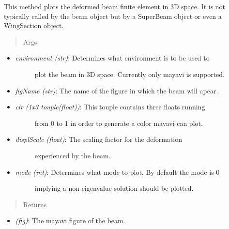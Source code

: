 \documentclass[letterpaper,10pt,english]{sphinxmanual}
\begin{document}
\begin{fulllineitems}
\begin{fulllineitems}
This method plots the deformed beam finite element in 3D space. It is
not typically called by the beam object but by a SuperBeam object
or even a WingSection object.
\begin{quote}\begin{description}
\item[{Args}] \leavevmode
\end{description}\end{quote}
\begin{itemize}
\item {} \begin{description}
\item[{\emph{environment (str)}: Determines what environment is to be used to}] \leavevmode
plot the beam in 3D space. Currently only mayavi is supported.

\end{description}

\item {} 
\emph{figName (str)}: The name of the figure in which the beam will apear.

\item {} \begin{description}
\item[{\emph{clr (1x3 touple(float))}: This touple contains three floats running}] \leavevmode
from 0 to 1 in order to generate a color mayavi can plot.

\end{description}

\item {} \begin{description}
\item[{\emph{displScale (float)}: The scaling factor for the deformation}] \leavevmode
experienced by the beam.

\end{description}

\item {} \begin{description}
\item[{\emph{mode (int)}: Determines what mode to plot. By default the mode is 0}] \leavevmode
implying a non-eigenvalue solution should be plotted.

\end{description}

\end{itemize}
\begin{quote}\begin{description}
\item[{Returns}] \leavevmode
\end{description}\end{quote}
\begin{itemize}
\item {} 
\emph{(fig)}: The mayavi figure of the beam.


\end{itemize}
\end{fulllineitems}
\end{fulllineitems}
\end{document}
